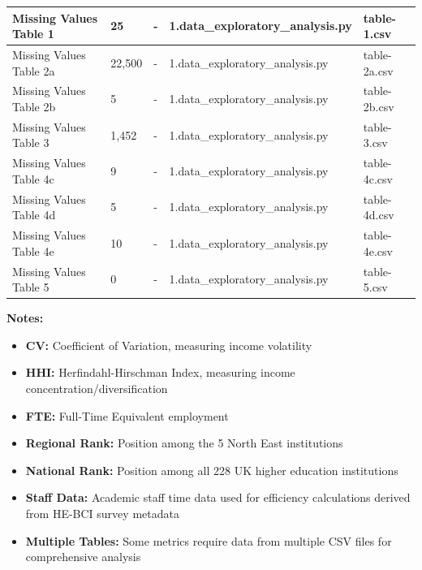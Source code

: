 \documentclass[journal,onecolumn, 10pt,draftclsnofoot]{IEEEtran}
\begin{document}
\begin{table}[h]
{\begin{tabular}{|l|l|l|l|l|}
\hline Missing Values Table 1 & 25 & - & 1.data\_exploratory\_analysis.py & table-1.csv \\
\hline Missing Values Table 2a & 22,500 & - & 1.data\_exploratory\_analysis.py & table-2a.csv \\
\hline Missing Values Table 2b & 5 & - & 1.data\_exploratory\_analysis.py & table-2b.csv \\
\hline Missing Values Table 3 & 1,452 & - & 1.data\_exploratory\_analysis.py & table-3.csv \\
\hline Missing Values Table 4c & 9 & - & 1.data\_exploratory\_analysis.py & table-4c.csv \\
\hline Missing Values Table 4d & 5 & - & 1.data\_exploratory\_analysis.py & table-4d.csv \\
\hline Missing Values Table 4e & 10 & - & 1.data\_exploratory\_analysis.py & table-4e.csv \\
\hline Missing Values Table 5 & 0 & - & 1.data\_exploratory\_analysis.py & table-5.csv \\
\hline
\end{tabular}
}
\label{tab:data-sources-complete}
\end{table}

\vspace{0.3cm}
\textbf{Notes:}
\begin{itemize}
    \item \textbf{CV:} Coefficient of Variation, measuring income volatility
    \item \textbf{HHI:} Herfindahl-Hirschman Index, measuring income concentration/diversification
    \item \textbf{FTE:} Full-Time Equivalent employment
    \item \textbf{Regional Rank:} Position among the 5 North East institutions
    \item \textbf{National Rank:} Position among all 228 UK higher education institutions
    \item \textbf{Staff Data:} Academic staff time data used for efficiency calculations derived from HE-BCI survey metadata
    \item \textbf{Multiple Tables:} Some metrics require data from multiple CSV files for comprehensive analysis
\end{itemize}

\end{document}
